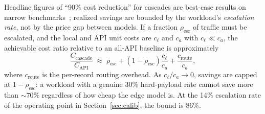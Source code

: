 \documentclass[conference]{IEEEtran}
\begin{document}
Headline figures of ``90\% cost reduction'' for cascades are best-case results on narrow benchmarks~\cite{frugalgpt}; realized savings are bounded by the workload's \emph{escalation rate}, not by the price gap between models. If a fraction $\rho_{\text{esc}}$ of traffic must be escalated, and the local and API unit costs are $c_\ell$ and $c_a$ with $c_\ell \ll c_a$, the achievable cost ratio relative to an all-API baseline is approximately
\begin{equation}
\frac{C_{\text{cascade}}}{C_{\text{API}}} \;\approx\; \rho_{\text{esc}} + (1-\rho_{\text{esc}})\frac{c_\ell}{c_a} + \frac{c_{\text{route}}}{c_a},
\label{eq:cost}
\end{equation}
where $c_{\text{route}}$ is the per-record routing overhead. As $c_\ell/c_a \to 0$, savings are capped at $1-\rho_{\text{esc}}$: a workload with a genuine 30\% hard-payload rate cannot save more than ${\sim}70\%$ regardless of how cheap the edge model is. At the 14\% escalation rate of the operating point in Section~\ref{sec:calib}, the bound is 86\%.
\end{document}
